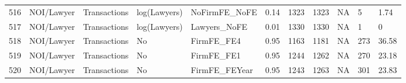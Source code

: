 \documentclass{article}
\begin{document}
\begin{table}[H]
\begin{tabular}{rllllllllll}
  516 & NOI/Lawyer & Transactions & log(Lawyers) & NoFirmFE\_NoFE & 0.14 & 1323 & 1323 & NA & 5 & 1.74 \\ 
  517 & NOI/Lawyer & Transactions & log(Lawyers) & Lawyers\_NoFE & 0.01 & 1330 & 1330 & NA & 1 & 0 \\ 
  518 & NOI/Lawyer & Transactions & No & FirmFE\_FE4 & 0.95 & 1163 & 1181 & NA & 273 & 36.58 \\ 
  519 & NOI/Lawyer & Transactions & No & FirmFE\_FE1 & 0.95 & 1244 & 1262 & NA & 270 & 23.18 \\ 
  520 & NOI/Lawyer & Transactions & No & FirmFE\_FEYear & 0.95 & 1243 & 1263 & NA & 301 & 23.83 \\ 
   \hline
\end{tabular}
\end{table}
\end{document}
